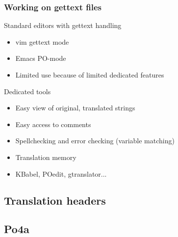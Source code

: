 \documentclass{beamer}
\begin{document}
\begin{frame}
  \frametitle{Working on gettext files}
	\begin{block}
		{Standard editors with gettext handling}
		\begin{itemize}
		\item
			vim gettext mode
		\item
			Emacs PO-mode
		\item
			Limited use because of limited dedicated features
		\end{itemize}
	\end{block}
	\begin{block}
		{Dedicated tools}
		\begin{itemize}
		\item
			Easy view of original, translated strings
		\item
			Easy access to comments
		\item
			Spellchecking and error checking (variable matching)
		\item
			Translation memory
		\item
			KBabel, POedit, gtranslator...
		\end{itemize}
	\end{block}
\end{frame}

\subsection{Translation headers}

\begin{frame}
  \frametitle{}
\end{frame}

\begin{frame}
  \frametitle{}
\end{frame}

\begin{frame}
  \frametitle{}
\end{frame}

\subsection{Po4a}
\end{document}
